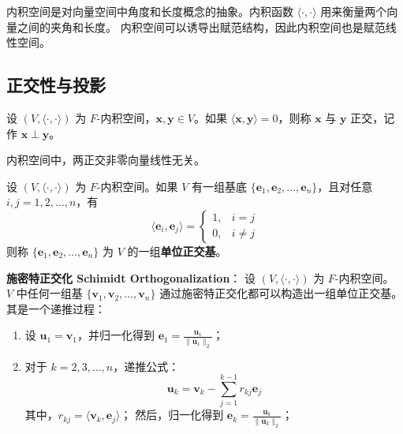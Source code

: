 \begin{note}
    内积空间是对向量空间中角度和长度概念的抽象。内积函数 $ \langle\cdot,\cdot\rangle $ 用来衡量两个向量之间的夹角和长度。
    内积空间可以诱导出赋范结构，因此内积空间也是赋范线性空间。
\end{note}

\subsection{正交性与投影}
\begin{definition}[正交 Orthogonality]
    设 $ (V,\langle\cdot,\cdot\rangle) $ 为 $F$-内积空间，$ \mathbf{x},\mathbf{y}\in V $。如果 $ \langle \mathbf{x},\mathbf{y}\rangle=0 $，则称 $ \mathbf{x} $ 与 $ \mathbf{y} $ 正交，记作 $ \mathbf{x}\perp \mathbf{y} $。
    \label{def:orthogonality}
\end{definition}

\begin{proposition}
    内积空间中，两正交非零向量线性无关。
\end{proposition}

\begin{definition}
    设 $ (V,\langle\cdot,\cdot\rangle) $ 为 $F$-内积空间。如果 $ V $ 有一组基底 $ \{\mathbf{e}_1,\mathbf{e}_2,\ldots,\mathbf{e}_n\} $，且对任意 $ i,j=1,2,\ldots,n $，有
    \[
        \langle \mathbf{e}_i,\mathbf{e}_j\rangle = \begin{cases}
            1, & i=j \\
            0, & i\neq j
        \end{cases}
    \]
    则称 $ \{\mathbf{e}_1,\mathbf{e}_2,\ldots,\mathbf{e}_n\} $ 为 $ V $ 的一组\textbf{单位正交基}。
    \label{def:orthonormal_basis}
\end{definition}

\textbf{施密特正交化 Schimidt Orthogonalization}： 设 $ (V,\langle\cdot,\cdot\rangle) $ 为 $F$-内积空间。
$V$ 中任何一组基 $ \{\mathbf{v}_1,\mathbf{v}_2,\ldots,\mathbf{v}_n\} $ 通过施密特正交化都可以构造出一组单位正交基。其是一个递推过程：
\begin{enumerate}
    \item 设 $ \mathbf{u}_1 = \mathbf{v}_1 $，并归一化得到 $ \mathbf{e}_1 = \frac{\mathbf{u}_1}{\|\mathbf{u}_1\|_2} $；
    \item 对于 $ k=2,3,\ldots,n $，递推公式：
    \[
        \mathbf{u}_k = \mathbf{v}_k - \sum_{j=1}^{k-1} r_{kj} \mathbf{e}_j
    \]
    其中，$ r_{kj} = \langle \mathbf{v}_k,\mathbf{e}_j\rangle $；
    然后，归一化得到 $ \mathbf{e}_k = \frac{\mathbf{u}_k}{\|\mathbf{u}_k\|_2} $；
\end{enumerate}


